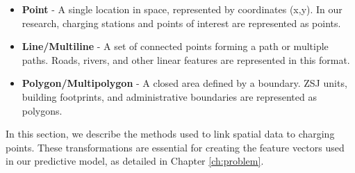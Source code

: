 \begin{kaobox}[frametitle=Spatial data types]

    \begin{itemize}
        \item \textbf{Point} - A single location in space, represented by coordinates (x,y). In our research, charging stations and points of interest are represented as points.
        \item \textbf{Line/Multiline} - A set of connected points forming a path or multiple paths. Roads, rivers, and other linear features are represented in this format.
        \item \textbf{Polygon/Multipolygon} - A closed area defined by a boundary. ZSJ units, building footprints, and administrative boundaries are represented as polygons.
    \end{itemize}
\end{kaobox}

In this section, we describe the methods used to link spatial data to charging points. These transformations are essential for creating the feature vectors used in our predictive model, as detailed in Chapter \ref{ch:problem}.


